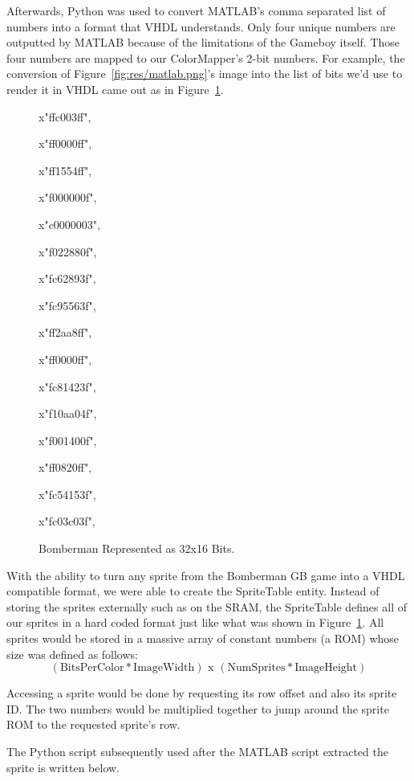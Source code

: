 \documentclass[10pt,a4paper]{article}
\begin{document}
Afterwards, Python was used to convert MATLAB's comma separated list of numbers into a format that VHDL understands. Only four unique numbers are outputted by MATLAB because of the limitations of the Gameboy itself. Those four numbers are mapped to our ColorMapper's 2-bit numbers. For example, the conversion of Figure~\ref{fig:res/matlab.png}'s image into the list of bits we'd use to render it in VHDL came out as in Figure~\ref{fig:tobits}.
\begin{figure}[H]
\centering
{\ttfamily
x"ffc003ff",

x"ff0000ff",

x"ff1554ff",

x"f000000f",

x"c0000003",

x"f022880f",

x"fc62893f",

x"fc95563f",

x"ff2aa8ff",

x"ff0000ff",

x"fc81423f",

x"f10aa04f",

x"f001400f",

x"ff0820ff",

x"fc54153f",

x"fc03c03f",}
\caption{Bomberman Represented as 32x16 Bits.}
\label{fig:tobits}
\end{figure}

With the ability to turn any sprite from the Bomberman GB game into a VHDL compatible format, we were able to create the SpriteTable entity. Instead of storing the sprites externally such as on the SRAM, the SpriteTable defines all of our sprites in a hard coded format just like what was shown in Figure~\ref{fig:tobits}. All sprites would be stored in a massive array of constant numbers (a ROM) whose size was defined as follows:
\[ (\mbox{BitsPerColor} * \mbox{ImageWidth}) \mbox{ x } (\mbox{NumSprites} * \mbox{ImageHeight}) \]

Accessing a sprite would be done by requesting its row offset and also its sprite ID. The two numbers would be multiplied together to jump around the sprite ROM to the requested sprite's row.

The Python script subsequently used after the MATLAB script extracted the sprite is written below.


\end{document}
